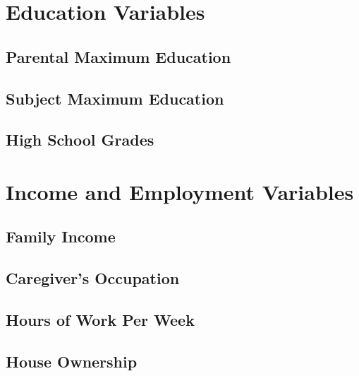 \section{Education Variables}
\label{sec:edu}
\subsection{Parental Maximum Education}

\subsection{Subject Maximum Education}

\subsection{High School Grades}


\section{Income and Employment Variables}
\label{sec:income}
\subsection{Family Income}

\subsection{Caregiver's Occupation}

\subsection{Hours of Work Per Week}

\subsection{House Ownership}